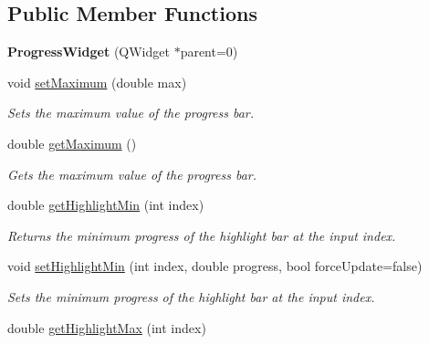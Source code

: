 \subsection*{Public Member Functions}
\begin{DoxyCompactItemize}
\item 
\hypertarget{class_progress_widget_a0804ac428f7930e4a5522c880a08ccd0}{{\bfseries Progress\-Widget} (Q\-Widget $\ast$parent=0)}\label{class_progress_widget_a0804ac428f7930e4a5522c880a08ccd0}

\item 
\hypertarget{class_progress_widget_a600227cff5964b15ee784f1d45548943}{void \hyperlink{class_progress_widget_a600227cff5964b15ee784f1d45548943}{set\-Maximum} (double max)}\label{class_progress_widget_a600227cff5964b15ee784f1d45548943}

\begin{DoxyCompactList}\small\item\em Sets the maximum value of the progress bar. \end{DoxyCompactList}\item 
\hypertarget{class_progress_widget_a96a60e49437c05b25b0ba9abe9cba2d7}{double \hyperlink{class_progress_widget_a96a60e49437c05b25b0ba9abe9cba2d7}{get\-Maximum} ()}\label{class_progress_widget_a96a60e49437c05b25b0ba9abe9cba2d7}

\begin{DoxyCompactList}\small\item\em Gets the maximum value of the progress bar. \end{DoxyCompactList}\item 
\hypertarget{class_progress_widget_a8fa688bee89ec88c26b93de431b39019}{double \hyperlink{class_progress_widget_a8fa688bee89ec88c26b93de431b39019}{get\-Highlight\-Min} (int index)}\label{class_progress_widget_a8fa688bee89ec88c26b93de431b39019}

\begin{DoxyCompactList}\small\item\em Returns the minimum progress of the highlight bar at the input index. \end{DoxyCompactList}\item 
void \hyperlink{class_progress_widget_a18f5e5044853a64027a3dd196dd1960f}{set\-Highlight\-Min} (int index, double progress, bool force\-Update=false)
\begin{DoxyCompactList}\small\item\em Sets the minimum progress of the highlight bar at the input index. \end{DoxyCompactList}\item 
\hypertarget{class_progress_widget_ae046512475964ccd85064e3016c0964c}{double \hyperlink{class_progress_widget_ae046512475964ccd85064e3016c0964c}{get\-Highlight\-Max} (int index)}\label{class_progress_widget_ae046512475964ccd85064e3016c0964c}


\end{DoxyCompactItemize}
